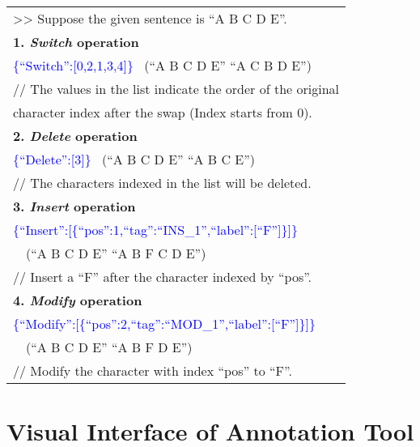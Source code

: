 \documentclass[11pt]{article}
\newcommand{\blue}[1]{\textcolor{blue}{#1}}
\begin{document}
\begin{tcolorbox}[colback=white,colframe=black,arc=1mm, auto outer arc,
                  boxrule=0.5pt,
                  left=5pt,
                  top=1pt,
                  bottom=1pt
                  ]
                  
    \begin{tabular}[c]{@{}l@{}}
    \small >> Suppose the given sentence is ``A B C D E''.   \\
    \small \textbf{1. \emph{Switch} operation} \\
    \small \blue{\{``Switch'':[0,2,1,3,4]\}} \, (``A B C D E''  ``A C B D E'') \\ 
    \small // The values in the list indicate the order of the original \\
    \small character index after the swap (Index starts from 0). \\
    \small \textbf{2. \emph{Delete} operation} \\
    \small \blue{\{``Delete'':[3]\}} \quad \quad \quad  \quad \, (``A B C D E''  ``A B C E'') \\ 
    \small // The characters indexed in the list will be deleted. \\
    \small \textbf{3. \emph{Insert} operation} \\
    \small \blue{\{``Insert'':[\{``pos'':1,``tag'':``INS\_1'',``label'':[``F'']\}]\}} \\
    \small \quad \quad \quad \quad \quad \quad  \quad \quad \, \,  (``A B C D E''  ``A B F C D E'') \\ 
    \small // Insert a ``F'' after the character indexed by ``pos''. \\
    \small \textbf{4. \emph{Modify} operation} \\
    \small \blue{\{``Modify'':[\{``pos'':2,``tag'':``MOD\_1'',``label'':[``F'']\}]\}} \\
    \small \quad \quad \quad \quad \quad \quad  \quad \quad \quad \, \,  (``A B C D E''  ``A B F D E'') \\ 
    \small // Modify the character with index ``pos'' to ``F''.
	\end{tabular}
\end{tcolorbox} 
\section{Visual Interface of Annotation Tool}
\label{appendix:annotool}
\end{document}

